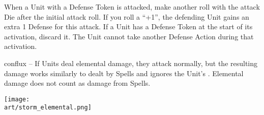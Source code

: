 \begin{multicols*}{2}
When a Unit with a Defense Token is attacked, make another roll with the attack Die after the initial attack roll.
If you roll a ``+1'', the defending Unit gains an extra 1 Defense for this attack.
If a Unit has a Defense Token at the start of its activation, discard it.
The Unit cannot take another Defense Action during that activation.\par
\begin{expansion}{conflux}
  \textbf{} – If Units deal elemental damage, they attack normally, but the resulting damage works similarly to  dealt by Spells and ignores the Unit's .
  Elemental damage does not count as damage from Spells.
\end{expansion}

\vspace*{\fill}
\begin{center}
  \hspace*{-2em}\texttt{[image: \\art/storm\_elemental.png]}
\end{center}
\end{multicols*}

